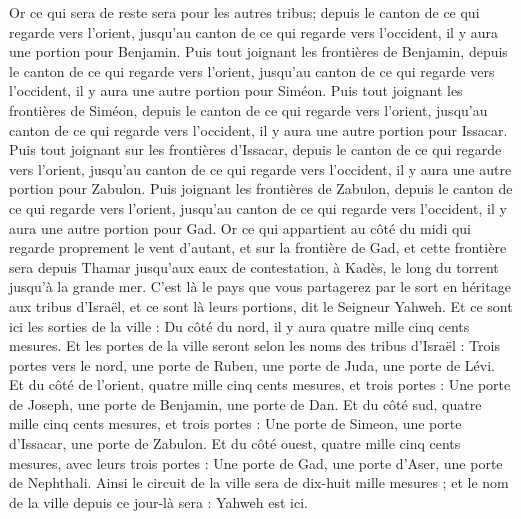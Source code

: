 \begin{multicols}{2}
Or ce qui sera de reste sera pour les autres tribus; depuis le canton de ce qui regarde vers l'orient, jusqu'au canton de ce qui regarde vers l'occident, il y aura une portion pour Benjamin.
Puis tout joignant les frontières de Benjamin, depuis le canton de ce qui regarde vers l'orient, jusqu'au canton de ce qui regarde vers l'occident, il y aura une autre portion pour Siméon.
Puis tout joignant les frontières de Siméon, depuis le canton de ce qui regarde vers l'orient, jusqu'au canton de ce qui regarde vers l'occident, il y aura une autre portion pour Issacar.
Puis tout joignant sur les frontières d'Issacar, depuis le canton de ce qui regarde vers l'orient, jusqu'au canton de ce qui regarde vers l'occident, il y aura une autre portion pour Zabulon.
Puis joignant les frontières de Zabulon, depuis le canton de ce qui regarde vers l'orient, jusqu'au canton de ce qui regarde vers l'occident, il y aura une autre portion pour Gad.
Or ce qui appartient au côté du midi qui regarde proprement le vent d'autant, et sur la frontière de Gad, et cette frontière sera depuis Thamar jusqu'aux eaux de contestation, à Kadès, le long du torrent jusqu'à la grande mer.
C'est là le pays que vous partagerez par le sort en héritage aux tribus d'Israël, et ce sont là leurs portions, dit le Seigneur Yahweh.
Et ce sont ici les sorties de la ville : Du côté du nord, il y aura quatre mille cinq cents mesures.
Et les portes de la ville seront selon les noms des tribus d'Israël : Trois portes vers le nord, une porte de Ruben, une porte de Juda, une porte de Lévi.
Et du côté de l'orient, quatre mille cinq cents mesures, et trois portes : Une porte de Joseph, une porte de Benjamin, une porte de Dan.
Et du côté sud, quatre mille cinq cents mesures, et trois portes : Une porte de Simeon, une porte d'Issacar, une porte de Zabulon.
Et du côté ouest, quatre mille cinq cents mesures, avec leurs trois portes : Une porte de Gad, une porte d'Aser, une porte de Nephthali.
Ainsi le circuit de la ville sera de dix-huit mille mesures ; et le nom de la ville depuis ce jour-là sera : Yahweh est ici.
\PPE{}
\end{multicols}
